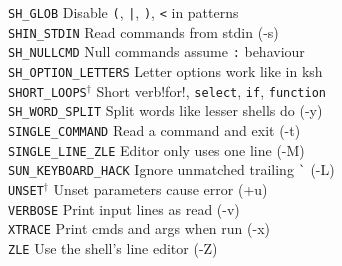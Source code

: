 \documentclass{article}
\newcommand\T[1]{\texttt{#1}}
\newcommand\D{$^\dag$}
\begin{document}
\begin{multicols}{3}
\begin{tabbing}
\T{SH\_GLOB}             \>\> Disable \verb!(!, \verb!|!, \verb!)!,
   \verb!<! in patterns \\
\T{SHIN\_STDIN}          \>\> Read commands from stdin (-s) \\
\T{SH\_NULLCMD}          \>\> Null commands assume \verb!:! behaviour \\
\T{SH\_OPTION\_LETTERS}  \>\> Letter options work like in ksh \\
\T{SHORT\_LOOPS}\D       \>\> Short \!verb!for!, \verb!select!, \verb!if!,
     \verb!function! \\
\T{SH\_WORD\_SPLIT}      \>\> Split words like lesser shells do (-y) \\
\T{SINGLE\_COMMAND}      \>\> Read a command and exit (-t) \\
\T{SINGLE\_LINE\_ZLE}    \>\> Editor only uses one line (-M) \\
\T{SUN\_KEYBOARD\_HACK}  \>\> Ignore unmatched trailing \verb!`! (-L) \\
\T{UNSET}\D              \>\> Unset parameters cause error (+u) \\
\T{VERBOSE}              \>\> Print input lines as read (-v) \\
\T{XTRACE}               \>\> Print cmds and args when run (-x) \\
\T{ZLE}                  \>\> Use the shell's line editor (-Z) \\
\end{tabbing}
\end{multicols}
\end{document}

